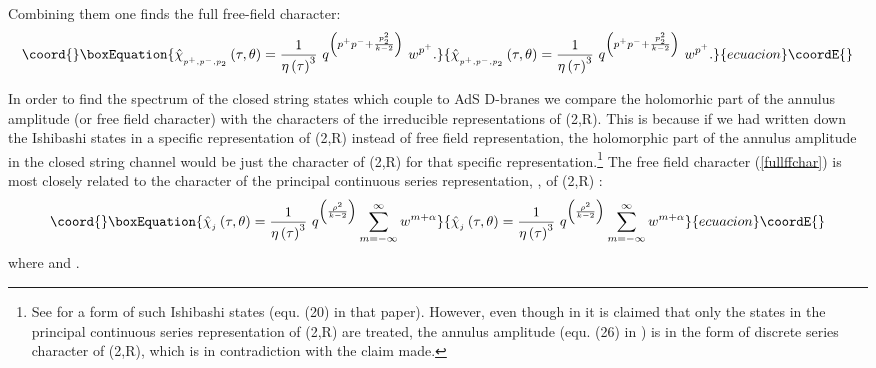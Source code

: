 \documentclass[a4paper,12pt]{article}
\begin{document}
Combining them one finds the full free-field character:
\begin{equation}\coord{}\boxEquation{
\hat{\chi}_{_{p^{+},p^{-},p_{2}}}\left( \tau ,\theta \right)
=\frac{1}{\eta \left( \tau \right) ^{3}}\ q^{\left(
p^{+}p^{-}+\frac{p_{2}^{2}}{k-2}\right) }\ w^{p^{+}}.
\label{fullffchar}
}{
\hat{\chi}_{_{p^{+},p^{-},p_{2}}}\left( \tau ,\theta \right)
=\frac{1}{\eta \left( \tau \right) ^{3}}\ q^{\left(
p^{+}p^{-}+\frac{p_{2}^{2}}{k-2}\right) }\ w^{p^{+}}.
}{ecuacion}\coordE{}\end{equation}

In order to find the spectrum of the closed string states which couple to AdS%
\coordHE{} D-branes we compare the holomorhic part of the annulus amplitude (or
free field character) with the characters of the irreducible representations
of \coordHE{}(2,R). This is because if we had written down the
Ishibashi states in a specific representation of \coordHE{}%
(2,R) instead of free field representation, the holomorphic part
of the annulus amplitude in the closed string channel would be
just the character of \coordHE{}(2,R) for that
specific representation.\footnote{%
See \cite{rajaraman} for a form of such Ishibashi states (equ.
(20) in that paper). However, even though in \cite{rajaraman} it
is claimed that only the states in the principal continuous series
representation of \coordHE{}(2,R) are treated, the
annulus amplitude (equ. (26) in \cite{rajaraman}) is in the form
of discrete series character of \coordHE{}(2,R),
which is in contradiction with the claim made.} The free field
character (\ref{fullffchar}) is most closely related to the
character of
the principal continuous series representation, \coordHE{}, of \coordHE{}(2,R) \cite{roberts}:
\begin{equation}\coord{}\boxEquation{
\hat{\chi}_{_{j}}\left( \tau ,\theta \right) =\frac{1}{\eta \left(
\tau \right) ^{3}}\ q^{\left( \frac{\rho ^{2}}{k-2}\right)
}\sum_{m=-\infty }^{\infty }w^{m+\alpha }
}{
\hat{\chi}_{_{j}}\left( \tau ,\theta \right) =\frac{1}{\eta \left(
\tau \right) ^{3}}\ q^{\left( \frac{\rho ^{2}}{k-2}\right)
}\sum_{m=-\infty }^{\infty }w^{m+\alpha }
}{ecuacion}\coordE{}\end{equation}
where \coordHE{} and \myHighlight{$\alpha \in \left[ 0,1\right) $}\coordHE{}.
\end{document}
